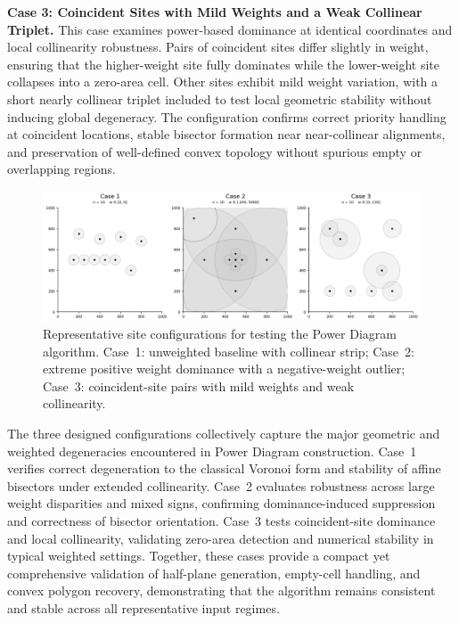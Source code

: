 \documentclass{article}
\begin{document}
\textbf{Case 3: Coincident Sites with Mild Weights and a Weak Collinear Triplet.}  
This case examines power-based dominance at identical coordinates and local collinearity robustness.  
Pairs of coincident sites differ slightly in weight, ensuring that the higher-weight site fully dominates while the lower-weight site collapses into a zero-area cell.  
Other sites exhibit mild weight variation, with a short nearly collinear triplet included to test local geometric stability without inducing global degeneracy.  
The configuration confirms correct priority handling at coincident locations, stable bisector formation near near-collinear alignments, and preservation of well-defined convex topology without spurious empty or overlapping regions.


\begin{figure}[H]
    \centering
    \includegraphics[width=0.95\linewidth]{Pictures/sites_cases.png}
    \caption{Representative site configurations for testing the Power Diagram algorithm. 
    Case~1: unweighted baseline with collinear strip; 
    Case~2: extreme positive weight dominance with a negative-weight outlier; 
    Case~3: coincident-site pairs with mild weights and weak collinearity.}
\end{figure}

The three designed configurations collectively capture the major geometric and weighted degeneracies encountered in Power Diagram construction.  
Case~1 verifies correct degeneration to the classical Voronoi form and stability of affine bisectors under extended collinearity.  
Case~2 evaluates robustness across large weight disparities and mixed signs, confirming dominance-induced suppression and correctness of bisector orientation.  
Case~3 tests coincident-site dominance and local collinearity, validating zero-area detection and numerical stability in typical weighted settings.  
Together, these cases provide a compact yet comprehensive validation of half-plane generation, empty-cell handling, and convex polygon recovery, demonstrating that the algorithm remains consistent and stable across all representative input regimes.
\end{document}
